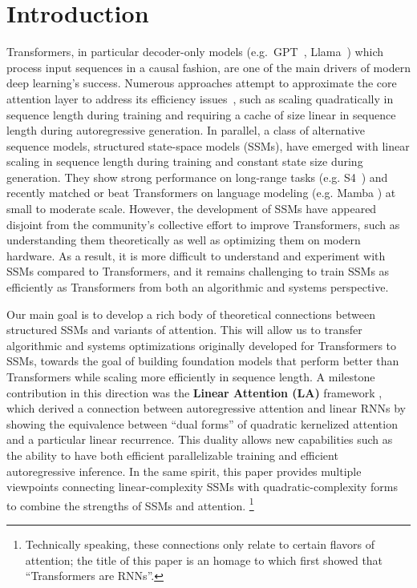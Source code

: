 \section{Introduction}
\label{sec:intro}


Transformers, in particular decoder-only models (e.g.\ GPT~\citep{brown2020language}, Llama~\citep{touvron2023llama}) which process input sequences in a causal fashion, are one of the main drivers of modern deep learning's success.
Numerous approaches attempt to approximate the core attention layer to address its efficiency issues~\citep{tay2022efficient}, such as scaling quadratically in sequence length during training and requiring a cache of size linear in sequence length during autoregressive generation.
In parallel, a class of alternative sequence models, structured state-space models (SSMs), have emerged with linear scaling in sequence length during training and constant state size during generation.
They show strong performance on long-range tasks (e.g. S4~\citep{gu2022efficiently}) and recently matched or beat Transformers on language modeling (e.g. Mamba \citep{gu2023mamba}) at small to moderate scale.
However, the development of SSMs have appeared disjoint from the community's collective effort to improve Transformers, such as understanding them theoretically as well as optimizing them on modern hardware.
As a result, it is more difficult to understand and experiment with SSMs compared to Transformers, and it remains challenging to train SSMs as efficiently as Transformers from both an algorithmic and systems perspective.


Our main goal is to develop a rich body of theoretical connections between structured SSMs and variants of attention.
This will allow us to transfer algorithmic and systems optimizations originally developed for Transformers to SSMs, towards the goal of building foundation models that perform better than Transformers while scaling more efficiently in sequence length.
A milestone contribution in this direction was the \textbf{Linear Attention (LA)} framework \citep{katharopoulos2020transformers},
which derived a connection between autoregressive attention and linear RNNs
by showing the equivalence between ``dual forms'' of quadratic kernelized attention and a particular linear recurrence.
This duality allows new capabilities such as the ability to have both efficient parallelizable training and efficient autoregressive inference.
In the same spirit, this paper provides multiple viewpoints connecting linear-complexity SSMs with quadratic-complexity forms to combine the strengths of SSMs and attention.%
\footnote{Technically speaking, these connections only relate to certain flavors of attention; the title of this paper is an homage to \citet{katharopoulos2020transformers} which first showed that ``Transformers are RNNs''.}

